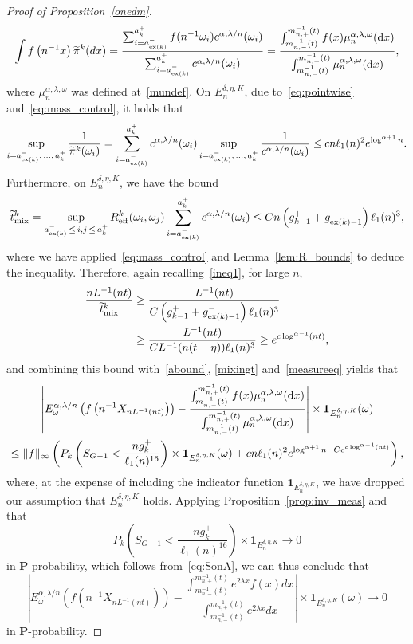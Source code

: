 \documentclass[10pt]{amsart}
\theoremstyle{definition}\newtheorem{defi}[theo]{Definition}\newtheorem{rema}[theo]{Remark}\newtheorem{exam}[theo]{Example}\newtheorem{exem}[theo]{Example}\newtheorem{nota}[theo]{Notation}
\newcommand{\bfP}{\mathbf{P}}
\newcommand{\bfun}{\mathbf{1}}
\newcommand{\mix}{\mathrm{mix}}
\newcommand{\eff}{\mathrm{eff}}
\newcommand{\dd}{\text{\upshape{d}}}
\newcommand\ex{\operatorname{ex}}
\newcommand{\aat}[1]{a_{\ex(#1)}^-}
\newcommand{\gtt}[1]{g_{\ex(#1)-1}^-}
\newcommand{\B}{{16}}
\let\oldtilde\tilde
\renewcommand*{\tilde}[1]{\mathchoice{\widetilde{#1}}{\widetilde{#1}}{\oldtilde{#1}}{\oldtilde{#1}}}
\begin{document}
\begin{proof}[Proof of Proposition~\ref{onedm}]
\begin{equation}
\int f\left(n^{-1}x\right)\tilde{\pi}^k(dx)=\frac{\sum_{i=\aat{k}}^{a_k^+}f(n^{-1}\omega_i)c^{\alpha,\lambda/n}(\omega_i)}{\sum_{i=\aat{k}}^{a_k^+}c^{\alpha,\lambda/n}(\omega_i)}=\frac{ \int_{m_{n,-}^{-1}(t)}^{m_{n,+}^{-1}(t)}f(x)\mu_n^{\alpha,\lambda,\omega}(\dd x)}{ \int_{m_{n,-}^{-1}(t)}^{m_{n,+}^{-1}(t)}\mu_n^{\alpha,\lambda,\omega}(\dd x)},
\end{equation}
where $\mu_n^{\alpha,\lambda,\omega}$ was defined at~\eqref{mundef}. On $E_n^{\delta,\eta,K}$, due to~\eqref{eq:pointwise} and~\eqref{eq:mass_control}, it holds that
\begin{align*}
\sup_{i=\aat{k},\,\dots,\,a_k^+} \frac{1}{\tilde \pi^k(\omega_i)}=\sum_{i=\aat{k}}^{a_k^+}c^{\alpha,\lambda/n}(\omega_i)\sup_{i=\aat{k},\,\dots,\,a_k^+}\frac{1}{c^{\alpha,\lambda/n}(\omega_i)}\leq c n\ell_1(n)^2 e^{\log^{\alpha+1}n}.
\end{align*}
Furthermore, on $E_n^{\delta,\eta,K}$, we have the bound
\[
\tilde{t}^k_{\mix}= \sup_{\aat{k}\,\leq \,i,j\,\leq\,a_k^+}R_\eff^k(\omega_i,\omega_j) \sum_{i=\aat{k}}^{a_k^+}c^{\alpha,\lambda/n}(\omega_i)\leq C n\left(g_{k-1}^++\gtt{k}\right)\ell_1(n)^3,
\]
where we have applied~\eqref{eq:mass_control} and Lemma~\ref{lem:R_bounds} to deduce the inequality. Therefore, again recalling~\eqref{ineq1}, for large $n$,
\begin{equation}\label{ggg}
\begin{split}
\frac{nL^{-1}(nt)}{\tilde{t}^k_{\mix}}&\geq \frac{L^{-1}(nt)}{C\left(g_{k-1}^++\gtt{k}\right)\ell_1(n)^3}\\
&\geq\frac{L^{-1}(nt)}{CL^{-1}(n(t-\eta))\ell_1(n)^3}\geq e^{c\log^{\alpha-1} (nt)},
\end{split}
\end{equation}
and combining this bound with~\eqref{abound}, \eqref{mixingt} and~\eqref{measureeq} yields that
\begin{multline*}
\left|{E}^{\alpha,\lambda/n}_\omega\left(f\left(n^{-1}{X}_{nL^{-1}(nt)}\right)\right)-\frac{ \int_{m_{n,-}^{-1}(t)}^{m_{n,+}^{-1}(t)}f(x)\mu_n^{\alpha,\lambda,\omega}(\dd x)}{ \int_{m_{n,-}^{-1}(t)}^{m_{n,+}^{-1}(t)}\mu_n^{\alpha,\lambda,\omega}(\dd x)}\right|\times\bfun_{E_n^{\delta,\eta,K}}(\omega)\\
\leq\|f\|_\infty\left({P}_k\left(S_{G-1}<\frac{ng_k^+}{\ell_1(n)^{\B}}\right)\times\bfun_{E_n^{\delta,\eta,K}}(\omega)+ c n\ell_1(n)^2 e^{\log^{\alpha+1}n-Ce^{c\log^{\alpha-1} (nt)}}\right),
\end{multline*}
where, at the expense of including the indicator function $\bfun_{E_n^{\delta,\eta,K}}$, we have dropped our assumption that $E_n^{\delta,\eta,K}$ holds. Applying Proposition~\ref{prop:inv_meas} and that
\[
{P}_k\left(S_{G-1}<\frac{ng_k^+}{\ell_1(n)^{\B}}\right)\times\bfun_{E_n^{\delta,\eta,K}}\rightarrow 0
\]
in $\bfP$-probability, which follows from~\eqref{eq:SonA}, we can thus conclude that
\[
\left|{E}^{\alpha,\lambda/n}_\omega\left(f\left(n^{-1}{X}_{nL^{-1}(nt)}\right)\right)-
\frac{\int_{m_{n,-}^{-1}(t)}^{m_{n,+}^{-1}(t)}e^{2\lambda x}f(x)dx}{\int_{m_{n,-}^{-1}(t)}^{m_{n,+}^{-1}(t)}e^{2\lambda x}dx}\right|\times\bfun_{E_n^{\delta,\eta,K}}(\omega)\rightarrow0
\]
in $\bfP$-probability.


\end{proof}
\end{document}
